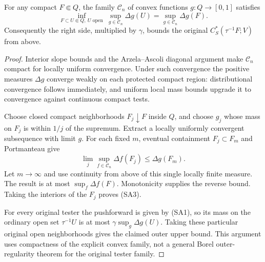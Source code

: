 \begin{lemma}
For any compact $F\Subset Q$, the family $\mathcal C_n$ of convex functions $g:Q\to[0,1]$ satisfies
\[
 \inf_{F\subset U\Subset Q,\ U\text{ open}}\ \sup_{g\in\mathcal C_n}\Delta g(U)
       =\sup_{g\in\mathcal C_n}\Delta g(F).
 \tag{SA3}
\]
Consequently the right side, multiplied by $\gamma$, bounds the original $C_S^*(\tau^{-1}F;V)$ from above.
\end{lemma}
\begin{proof}
Interior slope bounds and the Arzela--Ascoli diagonal argument make $\mathcal C_n$ compact for locally uniform convergence. Under such convergence the positive measures $\Delta g$ converge weakly on each protected compact region: distributional convergence follows immediately, and uniform local mass bounds upgrade it to convergence against continuous compact tests.

Choose closed compact neighborhoods $F_j\downarrow F$ inside $Q$, and choose $g_j$ whose mass on $F_j$ is within $1/j$ of the supremum. Extract a locally uniformly convergent subsequence with limit $g$. For each fixed $m$, eventual containment $F_j\subset F_m$ and Portmanteau give
\[
 \lim_j\sup_{f\in\mathcal C_n}\Delta f(F_j)\le\Delta g(F_m).
\]
Let $m\to\infty$ and use continuity from above of this single locally finite measure. The result is at most $\sup_f\Delta f(F)$. Monotonicity supplies the reverse bound. Taking the interiors of the $F_j$ proves (SA3).

For every original tester the pushforward is given by (SA1), so its mass on the ordinary open set $\tau^{-1}U$ is at most $\gamma\sup_g\Delta g(U)$. Taking these particular original open neighborhoods gives the claimed outer upper bound. This argument uses compactness of the explicit convex family, not a general Borel outer-regularity theorem for the original tester family.
\end{proof}

